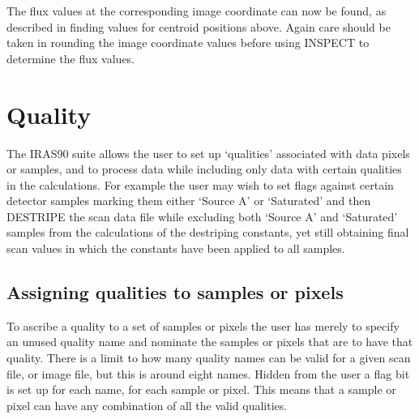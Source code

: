 \documentclass[twoside,11pt]{starlink}
\begin{document}
The flux values at the corresponding image coordinate can now be found, as
described in finding values for centroid positions above. Again care should be
taken in rounding the image coordinate values before using INSPECT to
determine the flux values.

\section{Quality
\label{a:quality}}

The IRAS90 suite allows the user to set up `qualities' associated with data
pixels or samples, and to process data while including only data with
certain qualities in the calculations.  For example the user may wish to set
flags against certain detector samples marking them either `Source A' or
`Saturated' and then DESTRIPE the scan data file while excluding both `Source A'
and `Saturated' samples from the calculations of the destriping constants, yet
still obtaining final scan values in which the constants have been applied to
all samples.
\subsection{Assigning qualities to samples or pixels}
To ascribe a quality to a set of samples or pixels the user has merely to
specify an unused quality name and nominate the samples or pixels that are to
have that quality. There is a limit to how many quality names can be valid for
a  given scan file, or image file, but this is around eight names. Hidden from
the user a flag bit is set up for each name, for each sample or pixel. This
means that a sample or pixel can have any combination of all the valid
qualities.
\end{document}
